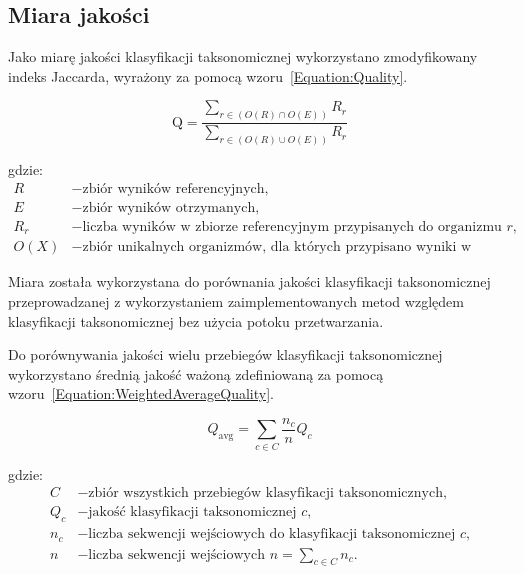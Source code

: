     \subsection{Miara jakości}

        Jako miarę jakości klasyfikacji taksonomicznej wykorzystano zmodyfikowany indeks Jaccarda, wyrażony za pomocą wzoru~\ref{Equation:Quality}.

        \begin{equation}
            \text{Q} = \frac{
                \sum_{r \in (O(R) \cap O(E))} R_{r}
            }{
                \sum_{r \in (O(R) \cup O(E))} R_{r}
            }
            \label{Equation:Quality}
        \end{equation}

        gdzie:
        \begin{align*}
            R &- \text{zbiór wyników referencyjnych,} \\
            E &- \text{zbiór wyników otrzymanych,} \\
            R_{r} &- \text{liczba wyników w zbiorze referencyjnym przypisanych do organizmu $r$,} \\
            O(X) &- \text{zbiór unikalnych organizmów, dla których przypisano wyniki w zbiorze X. }
        \end{align*}

        Miara została wykorzystana do porównania jakości klasyfikacji taksonomicznej przeprowadzanej z wykorzystaniem zaimplementowanych metod względem klasyfikacji taksonomicznej bez użycia potoku przetwarzania.

        Do porównywania jakości wielu przebiegów klasyfikacji taksonomicznej wykorzystano średnią jakość ważoną zdefiniowaną za pomocą wzoru~\ref{Equation:WeightedAverageQuality}.

        \begin{equation}
            Q_{\text{avg}} = \sum_{c \in C} \frac{n_c}{n} Q_c
            \label{Equation:WeightedAverageQuality}
        \end{equation}

        gdzie:
        \begin{align*}
          C &- \text{zbiór wszystkich przebiegów klasyfikacji taksonomicznych,} \\
          Q_c &- \text{jakość klasyfikacji taksonomicznej $c$,} \\
          n_c &- \text{liczba sekwencji wejściowych do klasyfikacji taksonomicznej $c$,}\\
          n   &- \text{liczba sekwencji wejściowych $n = \sum_{c \in C} n_{c}.$}
        \end{align*}

